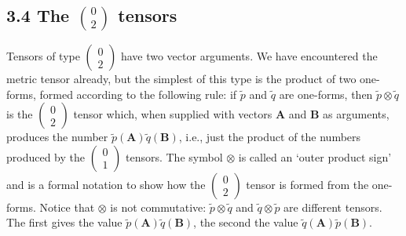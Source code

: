 \documentclass[11pt,letterpaper]{book}
\begin{document}
    \subsection{3.4 The \(\binom{0}{2}\) tensors}
    Tensors of type \(\left(\begin{array}{c} 0 \\ 2 \end{array}\right)\) have two vector arguments. We have encountered the metric tensor already, but the simplest of this type is the product of two one-forms, formed according to the following rule: if \(\tilde{p}\) and \(\tilde{q}\) are one-forms, then \(\tilde{p} \otimes \tilde{q}\) is the \(\left(\begin{array}{c} 0 \\ 2 \end{array}\right)\) tensor which, when supplied with vectors \(\mathbf{A}\) and \(\mathbf{B}\) as arguments, produces the number \(\tilde{p}(\mathbf{A}) \tilde{q}(\mathbf{B})\), i.e., just the product of the numbers produced by the \(\left(\begin{array}{c} 0 \\ 1 \end{array}\right)\) tensors. The symbol \(\otimes\) is called an ‘outer product sign’ and is a formal notation to show how the \(\left(\begin{array}{c} 0 \\ 2 \end{array}\right)\) tensor is formed from the one-forms. Notice that \(\otimes\) is not commutative: \(\tilde{p} \otimes \tilde{q}\) and \(\tilde{q} \otimes \tilde{p}\) are different tensors. The first gives the value \(\tilde{p}(\mathbf{A}) \tilde{q}(\mathbf{B})\), the second the value \(\tilde{q}(\mathbf{A}) \tilde{p}(\mathbf{B})\).
    
\end{document}
